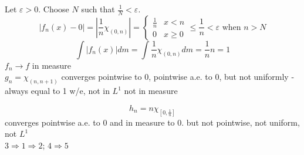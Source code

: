 Let $\varepsilon>0$. Choose $N$ such that $\frac{1}{N}< \varepsilon$.
\\
\[ |f_n(x)-0|=\left|\frac{1}{n}\chi_{(0, n)}\right|= \left\{\begin{array}{ll}
\frac{1}{n} & x  < n\\
0  & x\geq 0	
\end{array} \right.
\leq \frac{1}{n}< \varepsilon \text{ when } n>N
\]
\[
\int|f_n(x)|dm = \int \frac{1}{n}\chi_{(0,n)} dm = \frac{1}{n}n=1
\]
$
f_n \rightarrow f 
$
in measure\\
$
g_n = \chi_{(n, n+1)}
$
converges pointwise to 0, pointwise a.e. to 0, but not uniformly - always equal to 1 w/e, not in $L^1$ not in measure

\[
h_n = n \chi_{[0, \frac{1}{n}]}
\]
converges pointwise a.e. to 0 and in measure to 0. but not pointwise, not uniform, not $L^1$
\\
$3 \Rightarrow 1 \Rightarrow 2$; $4 \Rightarrow 5$
